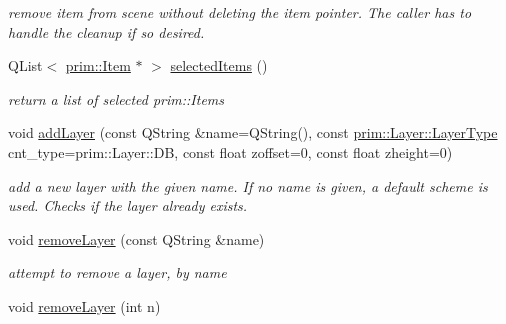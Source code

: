 \begin{DoxyCompactItemize}
\begin{DoxyCompactList}\small\item\em remove item from scene without deleting the item pointer. The caller has to handle the cleanup if so desired. \end{DoxyCompactList}\item 
Q\+List$<$ \hyperlink{classprim_1_1Item}{prim\+::\+Item} $\ast$ $>$ \hyperlink{classgui_1_1DesignPanel_a43a3463e364e4a01d37e183b4486487e}{selected\+Items} ()\hypertarget{classgui_1_1DesignPanel_a43a3463e364e4a01d37e183b4486487e}{}\label{classgui_1_1DesignPanel_a43a3463e364e4a01d37e183b4486487e}

\begin{DoxyCompactList}\small\item\em return a list of selected prim\+::\+Items \end{DoxyCompactList}\item 
void \hyperlink{classgui_1_1DesignPanel_aa4d27c11e683bfb7a3014f6662fd7bd1}{add\+Layer} (const Q\+String \&name=Q\+String(), const \hyperlink{classprim_1_1Layer_a9a9c22ae767c4671a07293b69c540547}{prim\+::\+Layer\+::\+Layer\+Type} cnt\+\_\+type=prim\+::\+Layer\+::\+DB, const float zoffset=0, const float zheight=0)\hypertarget{classgui_1_1DesignPanel_aa4d27c11e683bfb7a3014f6662fd7bd1}{}\label{classgui_1_1DesignPanel_aa4d27c11e683bfb7a3014f6662fd7bd1}

\begin{DoxyCompactList}\small\item\em add a new layer with the given name. If no name is given, a default scheme is used. Checks if the layer already exists. \end{DoxyCompactList}\item 
void \hyperlink{classgui_1_1DesignPanel_a33f167425c31422c609b7fcec0c0e093}{remove\+Layer} (const Q\+String \&name)\hypertarget{classgui_1_1DesignPanel_a33f167425c31422c609b7fcec0c0e093}{}\label{classgui_1_1DesignPanel_a33f167425c31422c609b7fcec0c0e093}

\begin{DoxyCompactList}\small\item\em attempt to remove a layer, by name \end{DoxyCompactList}\item 
void \hyperlink{classgui_1_1DesignPanel_a846b61a9aebaea5f004a4285d398fb97}{remove\+Layer} (int n)\hypertarget{classgui_1_1DesignPanel_a846b61a9aebaea5f004a4285d398fb97}{}\label{classgui_1_1DesignPanel_a846b61a9aebaea5f004a4285d398fb97}


\end{DoxyCompactItemize}

